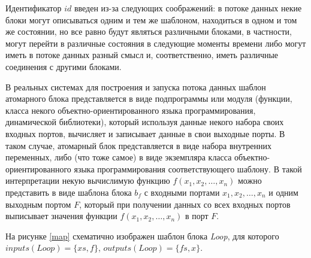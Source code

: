 \documentclass[10pt,a4paper]{article}
\begin{document}
Идентификатор $id$ введен из-за следующих соображений: в потоке данных некие блоки могут описываться одним и тем же шаблоном, находиться в одном и том же состоянии,
но все равно будут являться различными блоками, в частности, могут перейти в различные состояния в следующие моменты времени либо могут иметь в потоке данных разный смысл и,
соответственно, иметь различные соединения с другими блоками.

В реальных системах для построения и запуска потока данных шаблон атомарного блока представляется в виде подпрограммы или модуля
(функции, класса некого объектно-ориентированного языка программирования, динамической библиотеки), который используя данные некого набора своих входных портов,
вычисляет и записывает данные в свои выходные порты. В таком случае, атомарный блок представляется в виде набора внутренних переменных,
либо (что тоже самое) в виде экземпляра класса объектно-ориентированного языка программирования соответствующего шаблону.
В такой интерпретации некую вычислимую функцию $f(x_1, x_2, \dots, x_n)$ можно представить в виде шаблона блока $b_f$
с входными портами $x_1, x_2, \dots, x_n$ и одним выходным портом $F$, который при получении данных со всех входных портов
выписывает значения функции $f(x_1, x_2, \dots, x_n)$ в порт $F$.

На рисунке \ref{map} схематично изображен шаблон блока \textit{Loop}, для которого $inputs(Loop) = \{xs, f\}$, $outputs(Loop) = \{fs, x\}$.
\end{document}
